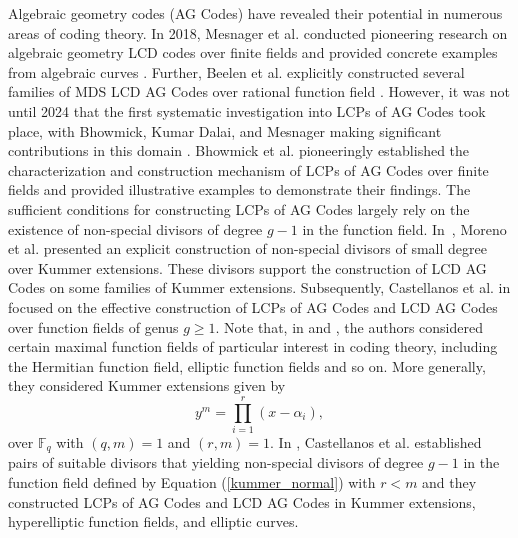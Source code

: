 \documentclass[journal,12pt,onecolumn]{IEEEtran}
\begin{document}
Algebraic geometry codes (AG Codes) have revealed their potential in numerous areas of coding theory. In 2018, Mesnager et al. conducted pioneering research on algebraic geometry LCD codes over finite fields and provided concrete examples from algebraic curves \cite{ComplementaryDualAGC}. Further, Beelen et al. 
explicitly constructed several families of MDS LCD AG Codes over rational function field \cite{8319441}. However, it was not until 2024 that the first systematic investigation into LCPs of AG Codes took place, with Bhowmick, Kumar Dalai, and Mesnager making significant contributions in this domain \cite{On_linear_complementary_pairs_of_algebraic_geometry_codes}. Bhowmick et al. pioneeringly established the characterization and construction mechanism of LCPs of AG Codes over finite fields and provided illustrative examples to demonstrate their findings. The sufficient conditions for constructing LCPs of AG Codes largely rely on the existence of non-special divisors of degree $g-1$ in the function field. In~\cite{Explicit_Non-special_Divisors_of_Small_Degree}, Moreno et al. presented an explicit construction of non-special divisors of small degree over Kummer extensions. These divisors support the construction of LCD AG Codes on some families of Kummer extensions. Subsequently, Castellanos et al. in \cite{Linear_Complementary_Dual_codes_and_Linear_Complementary_Pairs_of_AG_codes_in_function_fields} focused on the effective construction of LCPs of AG Codes and LCD AG Codes over function fields of genus $g\ge1$. Note that, in \cite{Explicit_Non-special_Divisors_of_Small_Degree} and \cite{Linear_Complementary_Dual_codes_and_Linear_Complementary_Pairs_of_AG_codes_in_function_fields}, the authors considered certain maximal function fields of particular interest in coding theory, including the Hermitian function field, elliptic function fields and so on. More generally, they considered Kummer extensions given by
\begin{equation}\label{kummer_normal}
    y^m = \prod_{i=1}^r(x - \alpha_i),
\end{equation}
over $\mathbb{F}_q$ with $(q,m) = 1$ and $(r,m)=1$. In \cite{Linear_Complementary_Dual_codes_and_Linear_Complementary_Pairs_of_AG_codes_in_function_fields}, Castellanos et al. established pairs of suitable divisors that yielding non-special divisors of degree $g-1$ in the function field defined by Equation (\ref{kummer_normal}) with $r<m$ and they constructed LCPs of AG Codes and LCD AG Codes in Kummer extensions, hyperelliptic function fields, and elliptic curves. 
\end{document}
